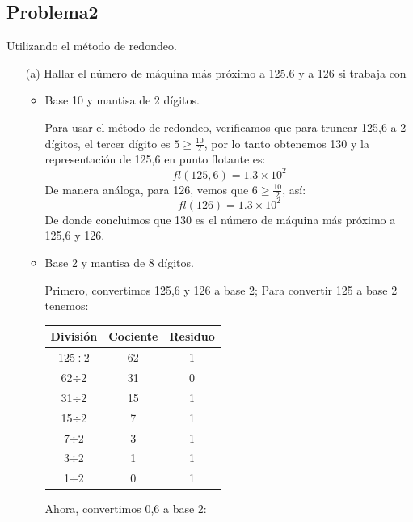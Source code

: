 \documentclass[12pt, a4paper]{article}%
\begin{document}
\subsection*{Problema2}
Utilizando el método de redondeo.

\begin{itemize}
    \item[(a)] Hallar el número de máquina más próximo a 125.6 y a 126 si trabaja con
    \begin{itemize}
        \item Base 10 y mantisa de 2 dígitos.
        \begin{solution}
            Para usar el método de redondeo, verificamos que para truncar 125,6 a 2 dígitos, el tercer dígito es $5\geq\frac{10}{2}$, por lo tanto obtenemos 130 y la representación de 125,6 en punto flotante es:
            \[
            fl(125,6)=1.3\times10^{2}
            \]
            De manera análoga, para 126, vemos que $6\geq\frac{10}{2}$, así:
            \[
            fl(126)=1.3\times10^{2}
            \]
            De donde concluimos que 130 es el número de máquina más próximo a 125,6 y 126.
        \end{solution}
        \item Base 2 y mantisa de 8 dígitos.
        \begin{solution}
            Primero, convertimos 125,6 y 126 a base 2; Para convertir 125 a base 2 tenemos:
            \begin{center}
            \renewcommand{\arraystretch}{1.2}
                \begin{tabular}{|c|c|c|}\hline
                División & Cociente & Residuo\\ \hline
                125$\div$2 & 62 & 1 \\ 
                62$\div$2 & 31 & 0 \\ 
                31$\div$2 & 15 & 1 \\
                15$\div$2 & 7 & 1 \\
                7$\div$2 & 3 & 1 \\
                3$\div$2 & 1 & 1 \\
                1$\div$2 & 0 & 1\\ \hline
                \end{tabular}
            \end{center}
            Ahora, convertimos 0,6 a base 2:
            \begin{center}
                \renewcommand{\arraystretch}{1.2}

\end{center}
\end{solution}
\end{itemize}
\end{itemize}
\end{document}
